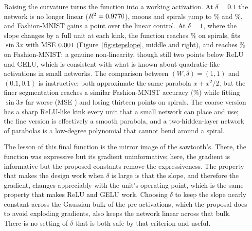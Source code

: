 \documentclass[11pt]{article}
\begin{document}
{Raising the curvature turns the function into a working activation. At $\delta=0.1$ the network is no
longer linear ($R^2=0.9770$), moons and spirals jump to \accSsMidMoons\% and \accSsMidSpirals\%,
and Fashion-MNIST gains a point over the linear control. At $\delta=1$, where the slope changes by a
full unit at each kink, the function reaches \accSsOneSpirals\% on spirals, fits $\sin 3x$ with MSE
$0.001$ (Figure~\ref{fig:stepslope}, middle and right), and reaches \accSsOneFashion\% on
Fashion-MNIST: a genuine non-linearity, though still two points below ReLU and GELU, which is
consistent with what is known about quadratic-like activations in small networks. The comparison
between $(W,\delta)=(1,1)$ and $(0.1,0.1)$ is instructive: both approximate the same parabola
$x+x^2/2$, but the finer segmentation reaches a similar Fashion-MNIST accuracy (\accSsFineFashion\%)
while fitting $\sin 3x$ far worse (MSE \mseSsFineSin) and losing thirteen points on spirals. The coarse
version has a sharp ReLU-like kink every unit that a small network can place and use; the fine
version is effectively a smooth parabola, and a two-hidden-layer network of parabolas is a
low-degree polynomial that cannot bend around a spiral.

The lesson of this final function is the mirror image of the sawtooth's. There, the function was
expressive but its gradient uninformative; here, the gradient is informative but the proposed
constants remove the expressiveness. The property that makes the design work when $\delta$ is large
is that the slope, and therefore the gradient, changes appreciably with the unit's operating point,
which is the same property that makes ReLU and GELU work. Choosing $\delta$ to keep the slope nearly
constant across the Gaussian bulk of the pre-activations, which the proposal does to avoid exploding
gradients, also keeps the network linear across that bulk. There is no setting of $\delta$ that is
both safe by that criterion and useful.
}{}
\end{document}
